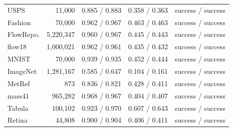 \begin{table}[p]
{\begin{tabular}{lrrrl}
USPS & 11,000 & 0.885 / 0.883 & 0.358 / 0.363 & success / success \\
Fashion & 70,000 & 0.962 / 0.967 & 0.463 / 0.463 & success / success \\
FlowRepo. & 5,220,347 & 0.960 / 0.967 & 0.445 / 0.443 & success / success \\
flow18 & 1,000,021 & 0.962 / 0.961 & 0.435 / 0.432 & success / success \\
MNIST & 70,000 & 0.939 / 0.935 & 0.452 / 0.444 & success / success \\
ImageNet & 1,281,167 & 0.585 / 0.647 & 0.104 / 0.161 & success / success \\
MetRef & 873 & 0.836 / 0.821 & 0.428 / 0.411 & success / success \\
mass41 & 965,282 & 0.968 / 0.967 & 0.404 / 0.407 & success / success \\
Tabula & 100,102 & 0.923 / 0.970 & 0.607 / 0.643 & success / success \\
Retina & 44,808 & 0.900 / 0.904 & 0.406 / 0.411 & success / success \\
\bottomrule
\end{tabular}%
}
\end{table}
